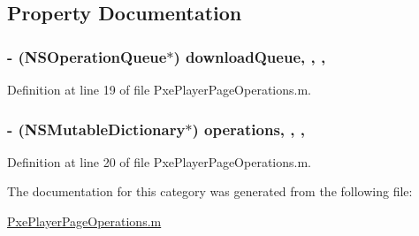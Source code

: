 \subsection{Property Documentation}
\hypertarget{category_pxe_player_page_operations_07_08_a29883d3f799de7d14a2bfbb6f1404a29}{
\subsubsection[{download\-Queue}]{\setlength{\rightskip}{0pt plus 5cm}-\/ (N\-S\-Operation\-Queue$\ast$) download\-Queue\hspace{0.3cm}{\ttfamily [read]}, {\ttfamily [write]}, {\ttfamily [nonatomic]}, {\ttfamily [strong]}}}\label{category_pxe_player_page_operations_07_08_a29883d3f799de7d14a2bfbb6f1404a29}


Definition at line 19 of file Pxe\-Player\-Page\-Operations.\-m.

\hypertarget{category_pxe_player_page_operations_07_08_aace2ae68fd45d3842ef28df4c9a4fef7}{
\subsubsection[{operations}]{\setlength{\rightskip}{0pt plus 5cm}-\/ (N\-S\-Mutable\-Dictionary$\ast$) operations\hspace{0.3cm}{\ttfamily [read]}, {\ttfamily [write]}, {\ttfamily [nonatomic]}, {\ttfamily [strong]}}}\label{category_pxe_player_page_operations_07_08_aace2ae68fd45d3842ef28df4c9a4fef7}


Definition at line 20 of file Pxe\-Player\-Page\-Operations.\-m.



The documentation for this category was generated from the following file\-:\begin{DoxyCompactItemize}
\item 
\hyperlink{_pxe_player_page_operations_8m}{Pxe\-Player\-Page\-Operations.\-m}\end{DoxyCompactItemize}
